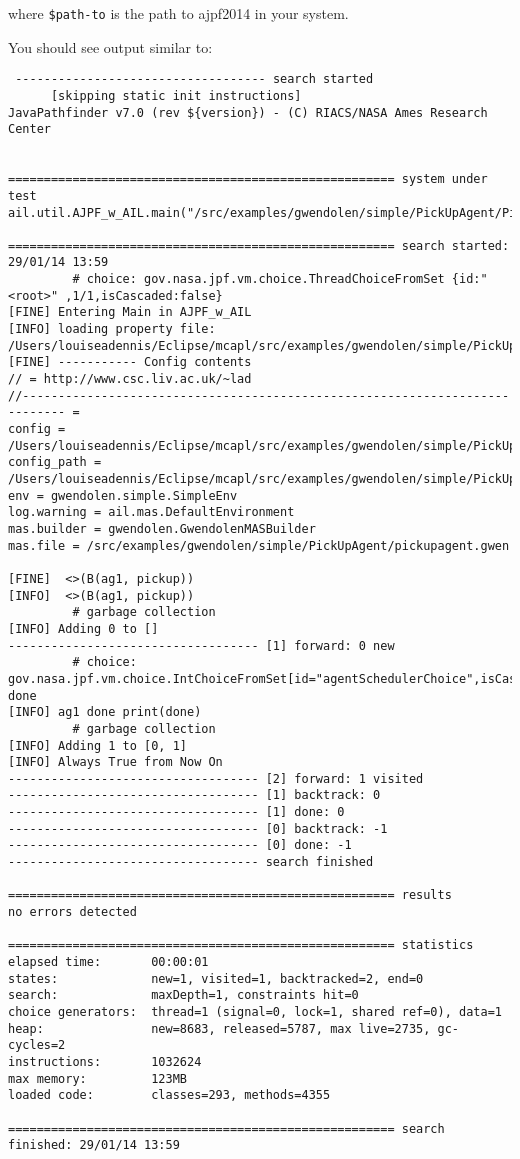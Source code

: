 \noindent where \texttt{\${path-to}} is the path to ajpf2014 in your system.

You should see output similar to: 

\noindent \begin{lstlisting}
 ----------------------------------- search started
      [skipping static init instructions]
JavaPathfinder v7.0 (rev ${version}) - (C) RIACS/NASA Ames Research Center


====================================================== system under test
ail.util.AJPF_w_AIL.main("/src/examples/gwendolen/simple/PickUpAgent/PickUpAgent.ail","/src/examples/gwendolen/simple/PickUpAgent/PickUpAgent.psl","0")

====================================================== search started: 29/01/14 13:59
		 # choice: gov.nasa.jpf.vm.choice.ThreadChoiceFromSet {id:"<root>" ,1/1,isCascaded:false}
[FINE] Entering Main in AJPF_w_AIL
[INFO] loading property file: /Users/louiseadennis/Eclipse/mcapl/src/examples/gwendolen/simple/PickUpAgent/PickUpAgent.ail
[FINE] ----------- Config contents
// = http://www.csc.liv.ac.uk/~lad
//---------------------------------------------------------------------------- = 
config = /Users/louiseadennis/Eclipse/mcapl/src/examples/gwendolen/simple/PickUpAgent/PickUpAgent.ail
config_path = /Users/louiseadennis/Eclipse/mcapl/src/examples/gwendolen/simple/PickUpAgent
env = gwendolen.simple.SimpleEnv
log.warning = ail.mas.DefaultEnvironment
mas.builder = gwendolen.GwendolenMASBuilder
mas.file = /src/examples/gwendolen/simple/PickUpAgent/pickupagent.gwen

[FINE]  <>(B(ag1, pickup))
[INFO]  <>(B(ag1, pickup))
		 # garbage collection
[INFO] Adding 0 to []
----------------------------------- [1] forward: 0 new
		 # choice: gov.nasa.jpf.vm.choice.IntChoiceFromSet[id="agentSchedulerChoice",isCascaded:false,>0]
done
[INFO] ag1 done print(done)
		 # garbage collection
[INFO] Adding 1 to [0, 1]
[INFO] Always True from Now On
----------------------------------- [2] forward: 1 visited
----------------------------------- [1] backtrack: 0
----------------------------------- [1] done: 0
----------------------------------- [0] backtrack: -1
----------------------------------- [0] done: -1
----------------------------------- search finished

====================================================== results
no errors detected

====================================================== statistics
elapsed time:       00:00:01
states:             new=1, visited=1, backtracked=2, end=0
search:             maxDepth=1, constraints hit=0
choice generators:  thread=1 (signal=0, lock=1, shared ref=0), data=1
heap:               new=8683, released=5787, max live=2735, gc-cycles=2
instructions:       1032624
max memory:         123MB
loaded code:        classes=293, methods=4355

====================================================== search finished: 29/01/14 13:59
\end{lstlisting}

